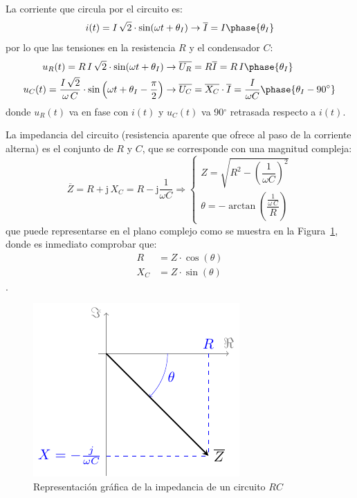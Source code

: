 	La corriente que circula por el circuito es:
	\begin{equation*}
		i(t)=I\,\sqrt{2}\cdot\sin(\omega t+\theta_I)\rightarrow\overline{I}=I\phase{\theta_I}
	\end{equation*}
	por lo que las tensiones en la resistencia $R$ y el condensador $C$:
	\begin{align*}
		u_R(t)=R\, I\,\sqrt{2}\cdot\sin(\omega t+\theta_I)&\rightarrow \overline{U_R} = R \overline{I}=R\,I\phase{\theta_I}\\ 
		u_C(t)=\dfrac{I\,\sqrt{2}}{\omega\,C} \cdot \sin \left(\omega t+\theta_I-\frac{\pi}{2}\right)&\rightarrow \overline{U_C}=\overline{X_C}\cdot\overline{I}=\dfrac{I}{\omega C}\phase{\theta_I-90^\circ}
	\end{align*}
	donde $u_R(t)$ va en fase con $i(t)$ y $u_C(t)$ va 90$^\circ$ retrasada respecto a $i(t)$. 
	
	La impedancia del circuito (resistencia aparente que ofrece al paso de la corriente alterna) es el conjunto de $R$ y $C$, que se corresponde con una magnitud compleja: 
	\begin{equation}
		\boxed{ \overline{Z} = R + \mathrm{j}\,X_C = R- \mathrm{j}\dfrac{1}{\omega C} \Rightarrow 
			\begin{cases}
				Z=\sqrt{R^2-\left(\dfrac{1}{\omega C} \right)^2}\\
				\theta=-\arctan\left(\dfrac{\frac{1}{\omega\,C}}{R} \right)
		\end{cases}}
	\end{equation}
	que puede representarse en el plano complejo como se muestra en la Figura~\ref{fig.fasorcondensadorreal}, donde es inmediato comprobar que:
	\begin{align*}
		R&=Z\cdot\cos(\theta)\\
		X_C&=Z\cdot\sin(\theta)
	\end{align*}. 
	\begin{figure}[H]
		\centering
		\includegraphics{../figs/fasorCondensadorReal.pdf}
		\caption{Representación gráfica de la impedancia de un circuito $RC$}
		\label{fig.fasorcondensadorreal}
	\end{figure}
	
